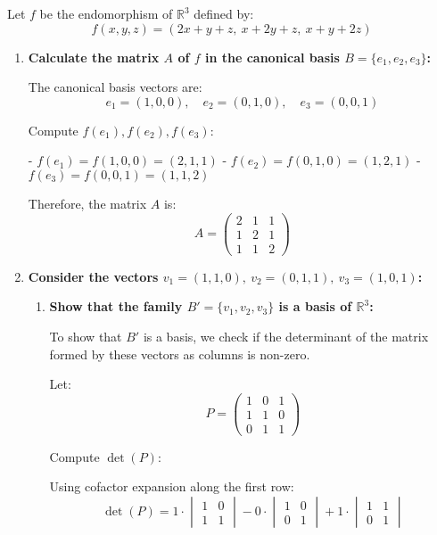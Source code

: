 \documentclass[12pt]{article}
\begin{document}
\begin{answerbox}
Let $ f $ be the endomorphism of $ \mathbb{R}^3 $ defined by:
$$
f(x, y, z) = (2x + y + z,\ x + 2y + z,\ x + y + 2z)
$$

\begin{enumerate}
    \item \textbf{Calculate the matrix $ A $ of $ f $ in the canonical basis $ B = \{e_1, e_2, e_3\} $:}
    
    The canonical basis vectors are:
    $$
    e_1 = (1, 0, 0), \quad e_2 = (0, 1, 0), \quad e_3 = (0, 0, 1)
    $$

    Compute $ f(e_1), f(e_2), f(e_3) $:

    - $ f(e_1) = f(1, 0, 0) = (2, 1, 1) $
    - $ f(e_2) = f(0, 1, 0) = (1, 2, 1) $
    - $ f(e_3) = f(0, 0, 1) = (1, 1, 2) $

    Therefore, the matrix $ A $ is:
    $$
    A = 
    \begin{pmatrix}
    2 & 1 & 1 \\
    1 & 2 & 1 \\
    1 & 1 & 2
    \end{pmatrix}
    $$

    \item \textbf{Consider the vectors $ v_1 = (1, 1, 0),\ v_2 = (0, 1, 1),\ v_3 = (1, 0, 1) $:}
    
    \begin{enumerate}
        \item \textbf{Show that the family $ B' = \{v_1, v_2, v_3\} $ is a basis of $ \mathbb{R}^3 $:}
        
        To show that $ B' $ is a basis, we check if the determinant of the matrix formed by these vectors as columns is non-zero.

        Let:
        $$
        P =
        \begin{pmatrix}
        1 & 0 & 1 \\
        1 & 1 & 0 \\
        0 & 1 & 1
        \end{pmatrix}
        $$

        Compute $ \det(P) $:

        Using cofactor expansion along the first row:
        $$
        \det(P) = 1 \cdot \begin{vmatrix} 1 & 0 \\ 1 & 1 \end{vmatrix}
        - 0 \cdot \begin{vmatrix} 1 & 0 \\ 0 & 1 \end{vmatrix}
        + 1 \cdot \begin{vmatrix} 1 & 1 \\ 0 & 1 \end{vmatrix}
        $$


\end{enumerate}
\end{enumerate}
\end{answerbox}
\end{document}

